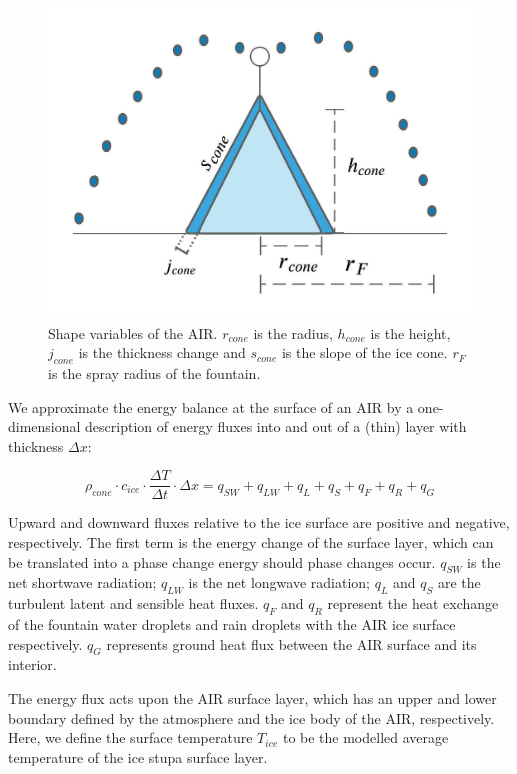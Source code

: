 \begin{figure}
	\begin{center}
		\includegraphics[width=10 cm]{figs/AIR_schematic.jpeg}
	\end{center}
	\caption{Shape variables of the AIR. $r_{cone}$ is the radius, $h_{cone}$ is the height, $j_{cone}$ is the
		thickness change and $s_{cone}$ is the slope of the ice cone. $r_F$ is the spray radius of the fountain.}
	\label{fig:shape}
\end{figure}

We approximate the energy balance at the surface of an AIR by a one-dimensional description of energy fluxes
into and out of a (thin) layer with thickness $\Delta x$:

\begin{equation}
	\rho_{cone} \cdot c_{ice} \cdot \frac{\Delta T}{\Delta t} \cdot \Delta x = q_{SW} + q_{LW} + q_{L} + q_{S} + q_{F}+ q_{R} + q_{G}
	\label{eqn:EB}
\end{equation}

Upward and downward fluxes relative to the ice surface are positive and negative, respectively. The first term
is the energy change of the surface layer, which can be translated into a phase change energy should phase
changes occur. $q_{SW}$ is the net shortwave radiation; $q_{LW}$ is the net longwave radiation; $q_{L}$ and
$q_{S}$ are the turbulent latent and sensible heat fluxes. $q_{F}$ and $q_{R}$ represent the heat exchange of
the fountain water droplets and rain droplets with the AIR ice surface respectively. $q_{G}$ represents ground
heat flux between the AIR surface and its interior.

The energy flux acts upon the AIR surface layer, which has an upper and lower boundary defined by the atmosphere
and the ice body of the AIR, respectively. Here, we define the surface temperature $T_{ice}$ to be the modelled
average temperature of the ice stupa surface layer.

